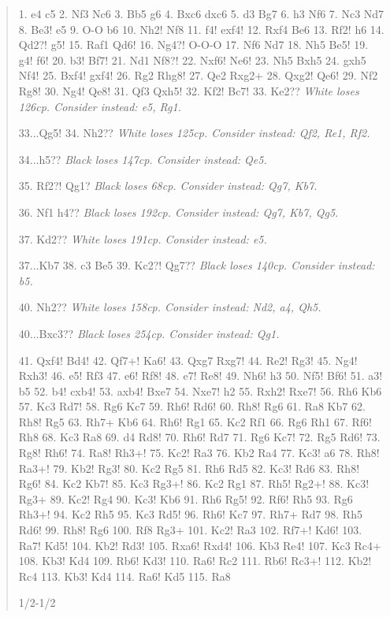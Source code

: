 \documentclass[11pt]{book}
\begin{document}
\begin{quote}
1. e4 c5
2. Nf3 Nc6
3. Bb5 g6
4. Bxc6 dxc6
5. d3 Bg7
6. h3 Nf6
7. Nc3 Nd7
8. Be3! e5
9. O-O b6
10. Nh2! Nf8
11. f4! exf4!
12. Rxf4 Be6
13. Rf2! h6
14. Qd2?! g5!
15. Raf1 Qd6!
16. Ng4?! O-O-O
17. Nf6 Nd7
18. Nh5 Be5!
19. g4! f6!
20. b3! Bf7!
21. Nd1 Nf8?!
22. Nxf6! Ne6!
23. Nh5 Bxh5
24. gxh5 Nf4!
25. Bxf4! gxf4!
26. Rg2 Rhg8!
27. Qe2 Rxg2+
28. Qxg2! Qe6!
29. Nf2 Rg8!
30. Ng4! Qe8!
31. Qf3 Qxh5!
32. Kf2! Bc7!
33. Ke2??
\textit{White loses 126cp. Consider instead: e5, Rg1.}

33...Qg5!
34. Nh2??
\textit{White loses 125cp. Consider instead: Qf2, Re1, Rf2.}

34...h5??
\textit{Black loses 147cp. Consider instead: Qe5.}

35. Rf2?! Qg1?
\textit{Black loses 68cp. Consider instead: Qg7, Kb7.}

36. Nf1 h4??
\textit{Black loses 192cp. Consider instead: Qg7, Kb7, Qg5.}

37. Kd2??
\textit{White loses 191cp. Consider instead: e5.}

37...Kb7
38. c3 Be5
39. Kc2?! Qg7??
\textit{Black loses 140cp. Consider instead: b5.}

40. Nh2??
\textit{White loses 158cp. Consider instead: Nd2, a4, Qh5.}

40...Bxc3??
\textit{Black loses 254cp. Consider instead: Qg1.}

41. Qxf4! Bd4!
42. Qf7+! Ka6!
43. Qxg7 Rxg7!
44. Re2! Rg3!
45. Ng4! Rxh3!
46. e5! Rf3
47. e6! Rf8!
48. e7! Re8!
49. Nh6! h3
50. Nf5! Bf6!
51. a3! b5
52. b4! cxb4!
53. axb4! Bxe7
54. Nxe7! h2
55. Rxh2! Rxe7!
56. Rh6 Kb6
57. Kc3 Rd7!
58. Rg6 Kc7
59. Rh6! Rd6!
60. Rh8! Rg6
61. Ra8 Kb7
62. Rh8! Rg5
63. Rh7+ Kb6
64. Rh6! Rg1
65. Kc2 Rf1
66. Rg6 Rh1
67. Rf6! Rh8
68. Kc3 Ra8
69. d4 Rd8!
70. Rh6! Rd7
71. Rg6 Kc7!
72. Rg5 Rd6!
73. Rg8! Rh6!
74. Ra8! Rh3+!
75. Kc2! Ra3
76. Kb2 Ra4
77. Kc3! a6
78. Rh8! Ra3+!
79. Kb2! Rg3!
80. Kc2 Rg5
81. Rh6 Rd5
82. Kc3! Rd6
83. Rh8! Rg6!
84. Kc2 Kb7!
85. Kc3 Rg3+!
86. Kc2 Rg1
87. Rh5! Rg2+!
88. Kc3! Rg3+
89. Kc2! Rg4
90. Kc3! Kb6
91. Rh6 Rg5!
92. Rf6! Rh5
93. Rg6 Rh3+!
94. Kc2 Rh5
95. Kc3 Rd5!
96. Rh6! Kc7
97. Rh7+ Rd7
98. Rh5 Rd6!
99. Rh8! Rg6
100. Rf8 Rg3+
101. Kc2! Ra3
102. Rf7+! Kd6!
103. Ra7! Kd5!
104. Kb2! Rd3!
105. Rxa6! Rxd4!
106. Kb3 Re4!
107. Kc3 Rc4+
108. Kb3! Kd4
109. Rb6! Kd3!
110. Ra6! Rc2
111. Rb6! Rc3+!
112. Kb2! Rc4
113. Kb3! Kd4
114. Ra6! Kd5
115. Ra8

1/2-1/2
\end{quote}
\end{document}

